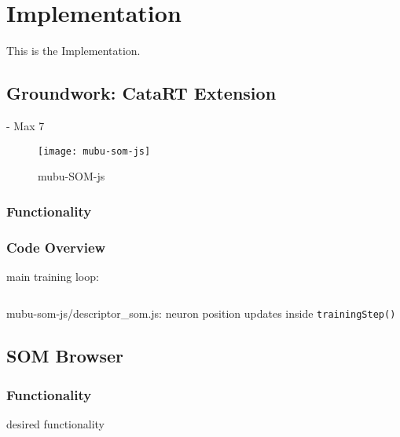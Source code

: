 
\section{Implementation}
\label{sec:implementation}
This is the Implementation.

\subsection{Groundwork: CataRT Extension}
\label{subsec:implementation_catart}

- Max 7

\begin{figure}[!htb]
  \centering
  \texttt{[image: mubu-som-js]}
  \caption{mubu-SOM-js}
  \label{fig:mubu-som}
\end{figure}

\subsubsection{Functionality}
\label{subsubec:mubu-som_functionality}

\subsubsection{Code Overview}
\label{subsubsec:mubu-som_overview}

main training loop:

\begin{listing}[!htb]
  \begin{mdframed}
    \inputminted[breaklines, numbers=left, firstline=306, lastline=312,
    fontsize=\footnotesize]{js}{../dev/mubu-som-js/descriptor_som.js}
  \end{mdframed}
  \caption{mubu-som-js/descriptor\_som.js: neuron position updates inside
  \texttt{trainingStep()}}
\end{listing}

\subsection{SOM Browser}
\label{subsec:implementation_som_browser}

\subsubsection{Functionality}
\label{subsubsec:som-browser_functionality}
desired functionality


